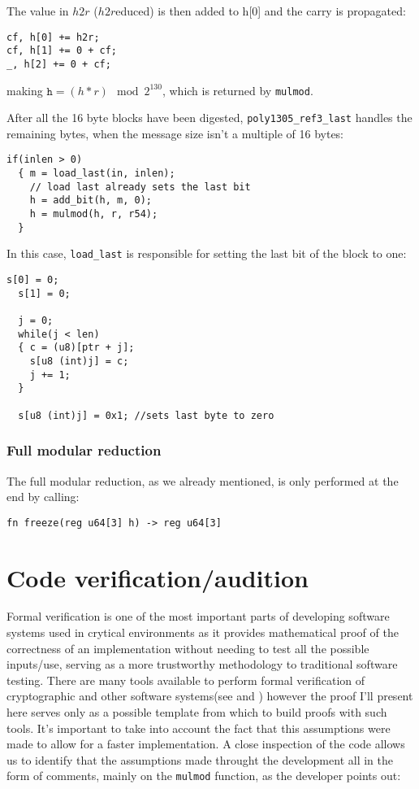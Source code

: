 \documentclass[twocolumn]{article}
\begin{document}
The value in $h2r$ ($h2r$educed) is then added to h[0] and the carry is propagated:

\begin{Verbatim}[fontsize=\footnotesize]
cf, h[0] += h2r;
cf, h[1] += 0 + cf;
_, h[2] += 0 + cf;
\end{Verbatim}

making $\texttt{h} = (h*r)\mod{2^{130}}$, which is returned by \texttt{mulmod}.

After all the 16 byte blocks have been digested, \texttt{poly1305\_ref3\_last} handles the remaining bytes, when the message size isn't a multiple of 16 bytes:
\begin{Verbatim}[fontsize=\footnotesize]
if(inlen > 0)
  { m = load_last(in, inlen);
    // load last already sets the last bit
    h = add_bit(h, m, 0);
    h = mulmod(h, r, r54);
  }
\end{Verbatim}
In this case, \texttt{load\_last} is responsible for setting the last bit of the block to one:
\begin{Verbatim}[fontsize=\footnotesize]
  s[0] = 0;
  s[1] = 0;

  j = 0;
  while(j < len)
  { c = (u8)[ptr + j];
    s[u8 (int)j] = c;
    j += 1;
  }

  s[u8 (int)j] = 0x1; //sets last byte to zero
\end{Verbatim}

\subsubsection{Full modular reduction}
The full modular reduction, as we already mentioned, is only performed at the end by calling:
\begin{Verbatim}[fontsize=\footnotesize]
fn freeze(reg u64[3] h) -> reg u64[3]
\end{Verbatim}


\section{Code verification/audition}
Formal verification is one of the most important parts of developing software systems used in crytical environments as it provides mathematical proof of the
correctness of an implementation without needing to test all the possible inputs/use, serving as a more trustworthy methodology to traditional software 
testing. There are many tools available to perform formal verification of cryptographic and other software systems(see \cite{coq_proof} and \cite{easycrypt}) 
however the proof I'll present here serves only as a possible template from which to build proofs with such tools.
It's important to take into account the fact that this assumptions were made to allow for a faster implementation.
A close inspection of the code allows us to identify that the assumptions made throught the development all in the form of comments, mainly on the
\texttt{mulmod} function, as the developer points out:
\end{document}
